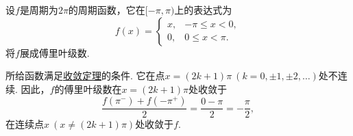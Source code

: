 \begin{example}
设\(f\)是周期为\(2\pi\)的周期函数，它在\([-\pi,\pi)\)上的表达式为\begin{equation*}
f(x) = \left\{ \begin{array}{cc}
x, & -\pi \leq x < 0, \\
0, & 0 \leq x < \pi.
\end{array} \right.
\end{equation*}
将\(f\)展成傅里叶级数.
\begin{solution}
所给函数满足\hyperref[theorem:无穷级数.傅里叶级数收敛的狄利克雷充分条件]{收敛定理}的条件.
它在点\(x=(2k+1)\pi\ (k=0,\pm1,\pm2,\dotsc)\)处不连续.
因此，\(f\)的傅里叶级数在\(x=(2k+1)\pi\)处收敛于\begin{equation*}
\frac{f(\pi^-)+f(-\pi^+)}{2} = \frac{0-\pi}{2} = -\frac{\pi}{2},
\end{equation*}在连续点\(x\ (x\neq(2k+1)\pi)\)处收敛于\(f\).


\end{solution}
\end{example}
